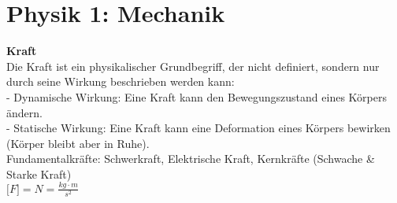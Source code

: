 \section{Physik 1: Mechanik}

\textbf{Kraft} \\
Die Kraft ist ein physikalischer Grundbegriff, der nicht 
definiert, sondern nur durch seine Wirkung beschrieben werden kann: \\
- Dynamische Wirkung: Eine Kraft kann den Bewegungszustand eines Körpers ändern. \\
-  Statische Wirkung: Eine Kraft kann eine Deformation eines Körpers bewirken (Körper bleibt aber in Ruhe). \\
Fundamentalkräfte: Schwerkraft, Elektrische Kraft, Kernkräfte (Schwache \& Starke Kraft) \\
$\lbrack F \rbrack =  N = \frac{kg \cdot m}{s^2}$ 
